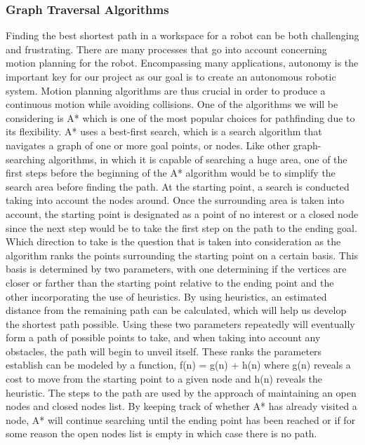 \documentclass[titlepage]{article}
\begin{document}
\subsubsection{Graph Traversal Algorithms}
Finding the best shortest path in a workspace for a robot can be both challenging and frustrating. There are many processes that go into account concerning motion planning for the robot. Encompassing many applications, autonomy is the important key for our project as our goal is to create an autonomous robotic system. Motion planning algorithms are thus crucial in order to produce a continuous motion while avoiding collisions. One of the algorithms we will be considering is A* which is one of the most popular choices for pathfinding due to its flexibility. A* uses a best-first search, which is a search algorithm that navigates a graph of one or more goal points, or nodes. Like other graph-searching algorithms, in which it is capable of searching a huge area, one of the first steps before the beginning of the A* algorithm would be to simplify the search area before finding the path. At the starting point, a search is conducted taking into account the nodes around. Once the surrounding area is taken into account, the starting point is designated as a point of no interest or a closed node since the next step would be to take the first step on the path to the ending goal.
Which direction to take is the question that is taken into consideration as the algorithm ranks the points surrounding the starting point on a certain basis. This basis is determined by two parameters, with one determining if the vertices are closer or farther than the starting point relative to the ending point and the other incorporating the use of heuristics. By using heuristics, an estimated distance from the remaining path can be calculated, which will help us develop the shortest path possible. Using these two parameters repeatedly will eventually form a path of possible points to take, and when taking into account any obstacles, the path will begin to unveil itself. These ranks the parameters establish can be modeled by a function, f(n) = g(n) + h(n) where g(n) reveals a cost to move from the starting point to a given node and h(n) reveals the heuristic. The steps to the path are used by the approach of maintaining an open nodes and closed nodes list. By keeping track of whether A* has already visited a node, A* will continue searching until the ending point has been reached or if for some reason the open nodes list is empty in which case there is no path.
\end{document}
